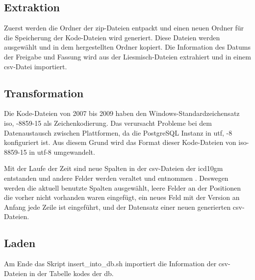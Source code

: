 \subsection{Extraktion}

Zuerst werden die Ordner der \ac{zip}-Dateien entpackt und einen neuen Ordner für die Speicherung der Kode-Dateien wird generiert. Diese Dateien werden ausgewählt und in dem hergestellten Ordner kopiert. Die Information des Datums der Freigabe und Fassung wird aus der Liesmisch-Dateien extrahiert und in einem \ac{csv}-Datei importiert.


\subsection{Transformation} \label{transf}

Die Kode-Dateien von 2007 bis 2009 haben den Windows-Standardzeichensatz \acl{iso}, -8859-15 als Zeichenkodierung. Das verursacht Probleme bei dem Datenaustausch zwischen Plattformen, da die PostgreSQL Instanz in \acl{utf}, -8 konfiguriert ist. Aus diesem Grund wird das Format dieser Kode-Dateien von \ac{iso}-8859-15 in \ac{utf}-8 umgewandelt.

Mit der Laufe der Zeit sind neue Spalten in der \ac{csv}-Dateien der \ac{icd10gm} entstanden und andere Felder werden veraltet und entnommen \cite{readme13, readme17}. Deswegen werden die aktuell benutzte Spalten ausgewählt, leere Felder an der Positionen die vorher nicht vorhanden waren eingefügt, ein neues Feld mit der Version an Anfang jede Zeile ist eingeführt, und der Datensatz einer neuen generierten \ac{csv}-Dateien.



\subsection{Laden}

Am Ende das Skript \textsf{insert\_into\_db.sh} importiert die Information der \ac{csv}-Dateien in der Tabelle \textsf{kodes} der \ac{db}.	